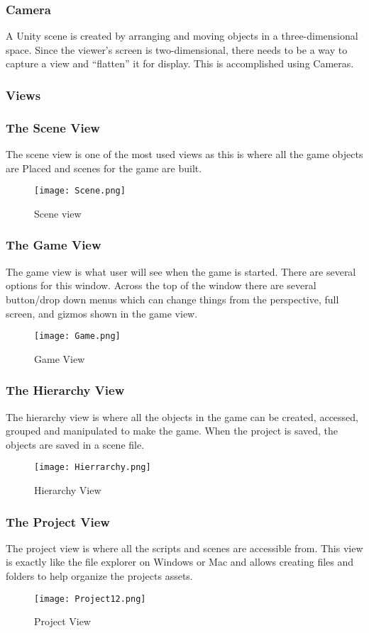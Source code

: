 \documentclass[12pt,a4paper]{article}
\begin{document}
\begin{center}
\begin{center}
\begin{itemize}
\end{itemize}
\subsubsection*{Camera}
A Unity scene is created by arranging and moving objects in a three-dimensional space. Since the viewer’s screen is two-dimensional, there needs to be a way to capture a view and “flatten” it for display. This is accomplished using Cameras.
\newpage
\subsubsection{Views}
\subsubsection*{ The Scene View}
The scene view is one of the most used views as this is where all the game objects are
Placed and scenes for the game are built.
\begin{figure}[H]
	\centering 
	\texttt{[image: Scene.png]}
	\caption{Scene view}	
\end{figure}
\newpage
\subsubsection*{ The Game View}
The game view is what user will see when the game is started. There are several options for this window. Across the top of the window there are several button/drop down menus which can change things from the perspective, full screen, and gizmos shown in the game view.
\begin{figure}[H]
	\centering 
	\texttt{[image: Game.png]}
	\caption{Game View}	
\end{figure}
\subsubsection*{ The Hierarchy View}
The hierarchy view is where all the objects in the game can be created, accessed, grouped and manipulated to make the game. When the project is saved, the objects are saved in a scene file.
\begin{figure}[H]
	\centering 
	\texttt{[image: Hierrarchy.png]}
	\caption{Hierarchy View}	
\end{figure}
\subsubsection*{ The Project View}
The project view is where all the scripts and scenes are accessible from. This view is
exactly like the file explorer on Windows or Mac and allows creating files and folders to
help organize the projects assets.
\begin{figure}[H]
	\centering 
	\texttt{[image: Project12.png]}
	\caption{Project View}	
\end{figure}

\end{center}
\end{center}
\end{document}
